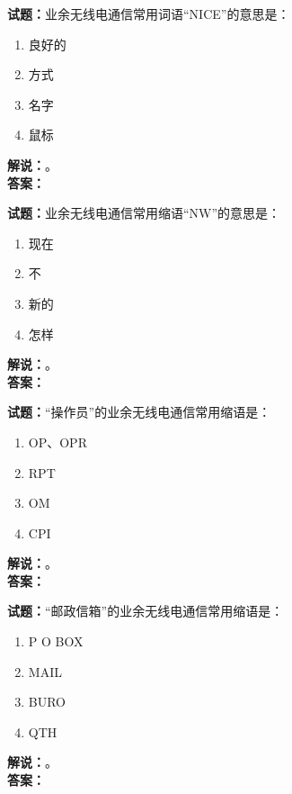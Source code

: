 \documentclass{ctexbook}
\begin{document}
\vspace{\baselineskip}

\noindent\textbf{试题：}业余无线电通信常用词语“NICE”的意思是：
\begin{enumerate}[leftmargin=3em]
  \item 良好的
  \item 方式
  \item 名字
  \item 鼠标
\end{enumerate}
\noindent\textbf{解说：}\textbf{}。\\\noindent\textbf{答案：}

\vspace{\baselineskip}

\noindent\textbf{试题：}业余无线电通信常用缩语“NW”的意思是：
\begin{enumerate}[leftmargin=3em]
  \item 现在
  \item 不
  \item 新的
  \item 怎样
\end{enumerate}
\noindent\textbf{解说：}\textbf{}。\\\noindent\textbf{答案：}

\vspace{\baselineskip}

\noindent\textbf{试题：}“操作员”的业余无线电通信常用缩语是：
\begin{enumerate}[leftmargin=3em]
  \item OP、OPR
  \item RPT
  \item OM
  \item CPI
\end{enumerate}
\noindent\textbf{解说：}\textbf{}。\\\noindent\textbf{答案：}

\vspace{\baselineskip}

\noindent\textbf{试题：}“邮政信箱”的业余无线电通信常用缩语是：
\begin{enumerate}[leftmargin=3em]
  \item P O BOX
  \item MAIL
  \item BURO
  \item QTH
\end{enumerate}
\noindent\textbf{解说：}\textbf{}。\\\noindent\textbf{答案：}
\end{document}

